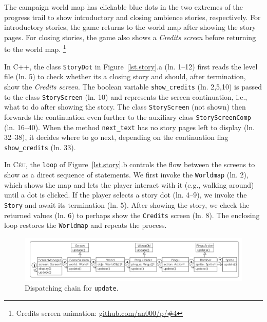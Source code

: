 \documentclass{vgtc}                          %
\newcommand{\CEU}{\textsc{C\'{e}u}\xspace}
\newcommand{\code}[1] {{\small{\texttt{#1}}}}
\begin{document}
The campaign world map has clickable blue dots in the two extremes of the
progress trail to show introductory and closing ambience stories, respectively.
For introductory stories, the game returns to the world map after showing 
the story pages.
For closing stories, the game also shows a \emph{Credits screen} before
returning to the world map.%
\footnote{Credits screen animation: \url{github.com/an000/p/#4} }

In C++, the class \code{StoryDot} in Figure~\ref{lst.story}.a (ln. 1--12) first
reads the level file (ln. 5) to check whether its a closing story and should,
after termination, show the \emph{Credits screen}.
%
The boolean variable \code{show\_credits} (ln. 2,5,10) is passed to the class
\code{StoryScreen} (ln. 10) and represents the screen continuation, i.e., what
to do after showing the story.
The class \code{StoryScreen} (not shown) then forwards the continuation even
further to the auxiliary class \code{StoryScreenComp} (ln. 16--40).
%
When the method \code{next\_text} has no story pages left to display
(ln. 32--38), it decides where to go next, depending on the continuation flag
\code{show\_credits} (ln. 33).

In \CEU, the \code{loop} of Figure~\ref{lst.story}.b controls the flow between
the screens to show as a direct sequence of statements.
%
We first invoke the \code{Worldmap} (ln. 2), which shows the map and lets
the player interact with it (e.g., walking around) until a dot is clicked.
If the player selects a story dot (ln. 4--9), we invoke the \code{Story}
and await its termination (ln. 5).
After showing the story, we check the returned values (ln. 6) to perhaps show
the \code{Credits} screen (ln. 8).
The enclosing loop restores the \code{Worldmap} and repeats the process.

\begin{figure}[t]
\centering
\includegraphics[width=\textwidth]{hierarchy}
\caption{Dispatching chain for \code{update}.
\label{fig.hier}
}
\end{figure}
\end{document}

